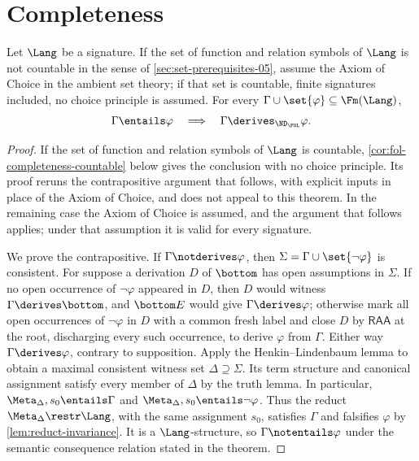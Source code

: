 \section{Completeness}
\label{sec:fol-metatheory-03}

\begin{theorem}
\label{thm:fol-completeness}
Let \(\Lang\) be a signature.  If the set of function and relation
symbols of \(\Lang\) is not countable in the sense of
\cref{sec:set-prerequisites-05}, assume the Axiom of Choice in the
ambient set theory; if that set is countable, finite signatures
included, no choice principle is assumed.  For every
\(\Gamma\cup\set{\varphi}\subseteq\Fm(\Lang)\),
\[
 \Gamma\entails\varphi
 \quad\Longrightarrow\quad
 \Gamma\derives_{\ND_{\FOL}}\varphi.
\]
\end{theorem}
\begin{proof}
If the set of function and relation symbols of \(\Lang\) is countable,
\cref{cor:fol-completeness-countable} below gives the conclusion with no
choice principle.  Its proof reruns the contrapositive argument that
follows, with explicit inputs in place of the Axiom of Choice, and does
not appeal to this theorem.  In the remaining case the Axiom of Choice
is assumed, and the argument that follows applies; under that
assumption it is valid for every signature.

We prove the contrapositive.  If \(\Gamma\notderives\varphi\), then
\(\Sigma=\Gamma\cup\set{\neg\varphi}\) is consistent.  For suppose a
derivation \(D\) of \(\bottom\) has open assumptions in \(\Sigma\).  If no
open occurrence of \(\neg\varphi\) appeared in \(D\), then \(D\) would
witness \(\Gamma\derives\bottom\), and \(\bottom E\) would give
\(\Gamma\derives\varphi\); otherwise mark all open occurrences of
\(\neg\varphi\) in \(D\) with a common fresh label and close \(D\) by
\(\mathsf{RAA}\) at the root, discharging every such occurrence, to
derive \(\varphi\) from \(\Gamma\).  Either way
\(\Gamma\derives\varphi\), contrary to supposition.  Apply the
Henkin--Lindenbaum lemma to obtain a maximal consistent witness set
\(\Delta\supseteq\Sigma\).  Its term structure and canonical assignment satisfy
every member of \(\Delta\) by the truth lemma.  In particular,
\(\Meta_\Delta,s_0\entails\Gamma\) and
\(\Meta_\Delta,s_0\entails\neg\varphi\).  Thus
the reduct \(\Meta_\Delta\restr\Lang\), with the same assignment \(s_0\),
satisfies \(\Gamma\) and falsifies \(\varphi\) by
\cref{lem:reduct-invariance}.  It is a \(\Lang\)-structure, so
\(\Gamma\notentails\varphi\) under the semantic consequence relation stated
in the theorem.
\end{proof}

